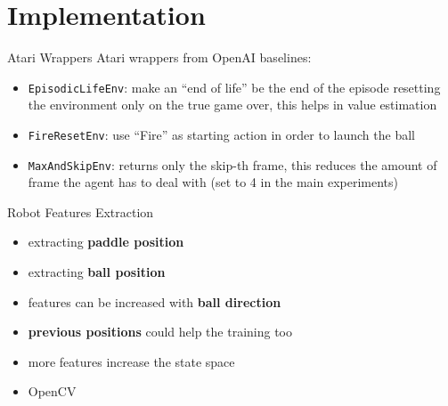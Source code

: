 \section{Implementation}

\begin{frame}{Atari Wrappers}
    Atari wrappers from OpenAI baselines:
    \begin{itemize}
    \item \texttt{EpisodicLifeEnv}: make an ``end of life'' be the end
        of the episode resetting the environment only on the true
        game over, this helps in value estimation
    \item \texttt{FireResetEnv}: use ``Fire'' as starting action in order
        to launch the ball
    \item \texttt{MaxAndSkipEnv}: returns only the skip-th frame, this
        reduces the amount of frame the agent has to deal with (set to 4
        in the main experiments)
\end{itemize}
\end{frame}

\begin{frame}{Robot Features Extraction}
    \begin{itemize}
        \item extracting \textbf{paddle position}
        \item extracting \textbf{ball position}
        \item features can be increased with \textbf{ball direction}
        \item \textbf{previous positions} could help the training too
        \item more features increase the state space
        \item OpenCV
    \end{itemize}
\end{frame}

